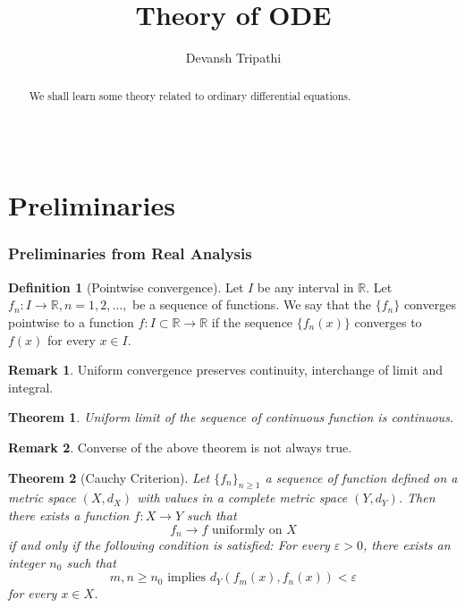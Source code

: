 \documentclass[12pt,reqno]{amsart}
\title{Theory of ODE}
\author{Devansh Tripathi}
\theoremstyle{plain}
\newtheorem{thm}{Theorem}
\theoremstyle{definition}
\newtheorem{defn}{Definition}
\newtheorem{rem}{Remark}
\begin{document}
\begin{abstract}
    We shall learn some theory related to ordinary differential equations.
\end{abstract}
\maketitle
{\large \part{\centering \\ Preliminaries}}
\section{Preliminaries from Real Analysis}
\begin{defn}[Pointwise convergence]
    Let $I$ be any interval in $\mathbb{R}$. Let $f_n:I \rightarrow \mathbb{R}, n = 1,2,\dots,$ be a sequence of functions. We say that the $\{f_n\}$ converges pointwise to a function $f:I\subset \mathbb{R} \rightarrow \mathbb{R}$ if the sequence $\{f_n(x)\}$ converges to $f(x)$ for every $x \in I$.
\end{defn}
\begin{rem}
    Uniform convergence preserves continuity, interchange of limit and integral.
\end{rem}
\begin{thm}
    Uniform limit of the sequence of continuous function is continuous.
\end{thm}
\begin{rem}
    Converse of the above theorem is not always true.
\end{rem}
\begin{thm}[Cauchy Criterion]
    Let $\{f_n\}_{n\geq 1}$ a sequence of function defined on a metric space $(X,d_X)$ with values in a complete metric space $(Y,d_Y)$. Then there exists a function $f:X \to Y$ such that 
    $$ f_n \to f \text{ uniformly on } X$$
    if and only if the following condition is satisfied: For every $\varepsilon > 0$, there exists an integer $n_0$ such that
    $$ m,n \geq n_0 \text{ implies } d_Y(f_m(x),f_n(x)) < \varepsilon $$
    for every $x \in X$.
\end{thm}
\end{document}
